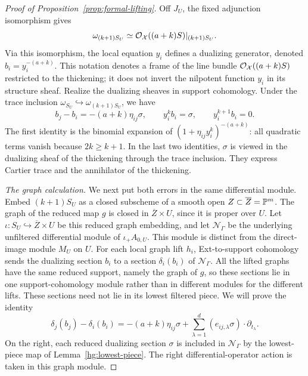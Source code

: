 \begin{proof}[Proof of Proposition~\ref{prop:formal-lifting}]
Off \(J_U\), the fixed adjunction isomorphism gives
\[
 \omega_{(k+1)S_U}
 \simeq\mathcal{O}_{\mathcal X}((a+k)S)|_{(k+1)S_U}.
\]
Via this isomorphism, the local equation \(y_i\) defines a
dualizing generator, denoted \(b_i=y_i^{-(a+k)}\).  This
notation denotes a frame of the line bundle
\(\mathcal{O}_{\mathcal X}((a+k)S)\) restricted to the thickening;
it does not invert the nilpotent function \(y_i\) in its
structure sheaf.  Realize the dualizing sheaves in support cohomology.  Under
the trace inclusion
\(\omega_{S_U}\hookrightarrow\omega_{(k+1)S_U}\), we have
\begin{equation}\label{hg:dualizing-errors}
 b_j-b_i=-(a+k)\eta_{ij}\sigma,\qquad
 y_i^kb_i=\sigma,\qquad y_i^{k+1}b_i=0.
\end{equation}
The first identity is the binomial expansion of
\((1+\eta_{ij}y_i^k)^{-(a+k)}\): all quadratic terms vanish
because \(2k\geq k+1\).  In the last two identities,
\(\sigma\) is viewed in the dualizing sheaf of the thickening
through the trace inclusion.  They express Cartier trace and
the annihilator of the thickening.

\smallskip\noindent\emph{The graph calculation.}
We next put both errors in the same differential module.  Embed
\((k+1)S_U\) as a closed subscheme of a smooth open
\(Z\subset\overline Z=\mathbb{P}^m\).  The graph of the reduced map
\(g\) is closed in \(\overline Z\times U\), since it is proper
over \(U\).  Let \(\iota:S_U\hookrightarrow\overline Z\times U\)
be this reduced graph embedding, and let \(\mathcal N_\Gamma\)
be the underlying unfiltered differential module of
\(\iota_+A_{0,U}\).  This module is distinct from the direct-image
module \(M_U\) on \(U\).  For each local graph lift \(h_i\),
Ext-to-support cohomology sends the dualizing section \(b_i\)
to a section \(\delta_i(b_i)\) of \(\mathcal N_\Gamma\).
All the lifted graphs have the same reduced support, namely
the graph of \(g\), so these sections lie in one support-cohomology
module rather than in different modules for the different lifts.
These sections need not lie in its lowest filtered piece.
We will prove the identity
\begin{equation}\label{hg:graph-identity}
 \delta_j(b_j)-\delta_i(b_i)
 =
 -(a+k)\eta_{ij}\sigma
 +\sum_{\lambda=1}^d
          (e_{ij,\lambda}\sigma)\cdot\partial_{t_\lambda}.
\end{equation}
On the right, each reduced dualizing section \(\sigma\) is
included in \(\mathcal N_\Gamma\) by the lowest-piece map of
Lemma~\ref{hg:lowest-piece}.  The right differential-operator
action is taken in this graph module.


\end{proof}
